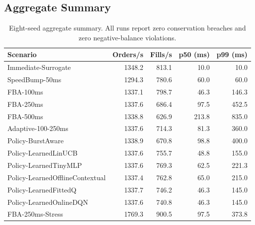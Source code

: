 \documentclass[11pt]{article}
\begin{document}
\subsection{Aggregate Summary}
\begin{table}[t]
\centering
\begin{tabular}{lrrrr}
\toprule
Scenario & Orders/s & Fills/s & p50 (ms) & p99 (ms) \\
\midrule
Immediate-Surrogate & 1348.2 & 813.1 & 10.0 & 10.0 \\
SpeedBump-50ms & 1294.3 & 780.6 & 60.0 & 60.0 \\
FBA-100ms & 1337.1 & 798.7 & 46.3 & 146.3 \\
FBA-250ms & 1337.6 & 686.4 & 97.5 & 452.5 \\
FBA-500ms & 1338.8 & 626.9 & 213.8 & 835.0 \\
Adaptive-100-250ms & 1337.6 & 714.3 & 81.3 & 360.0 \\
Policy-BurstAware & 1338.9 & 670.8 & 98.8 & 400.0 \\
Policy-LearnedLinUCB & 1337.6 & 755.7 & 48.8 & 155.0 \\
Policy-LearnedTinyMLP & 1337.6 & 769.3 & 62.5 & 221.3 \\
Policy-LearnedOfflineContextual & 1337.4 & 762.8 & 65.0 & 215.0 \\
Policy-LearnedFittedQ & 1337.7 & 746.2 & 46.3 & 145.0 \\
Policy-LearnedOnlineDQN & 1337.6 & 740.8 & 46.3 & 145.0 \\
FBA-250ms-Stress & 1769.3 & 900.5 & 97.5 & 373.8 \\
\bottomrule
\end{tabular}
\caption{Eight-seed aggregate summary. All runs report zero conservation breaches and zero negative-balance violations.}
\end{table}
\end{document}
